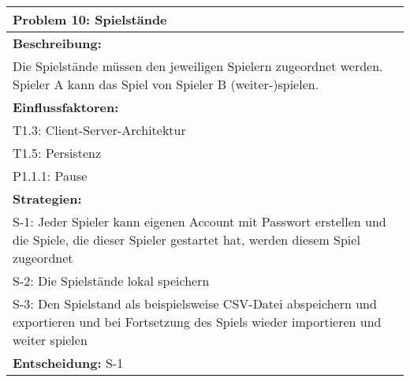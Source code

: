 \documentclass[fontsize=12pt,paper=a4,twoside]{scrartcl}
\begin{document}
\begin{longtable}{|p{15cm}|}
\hline
Problem 10: Spielstände                                                                     
\\ \hline                                                                                                                                                                                                                                                                                                                                                                                                                                                                                                                                                        
\textbf{Beschreibung:} \\
Die Spielstände müssen den jeweiligen Spielern zugeordnet werden. Spieler A kann das Spiel von Spieler B (weiter-)spielen.
\\ \hline
\textbf{Einflussfaktoren:} \\
T1.3: Client-Server-Architektur\\
T1.5: Persistenz \\
P1.1.1: Pause
\\ \hline
\textbf{Strategien:} \\
S-1: Jeder Spieler kann eigenen Account mit Passwort erstellen und die Spiele, die dieser Spieler gestartet hat, werden diesem Spiel zugeordnet \\
S-2: Die Spielstände lokal speichern \\
S-3: Den Spielstand als beispielsweise CSV-Datei abspeichern und exportieren und bei Fortsetzung des Spiels wieder importieren und weiter spielen
 \\ \hline
 \textbf{Entscheidung:} S-1
\\ \hline
\end{longtable}
\end{document}
